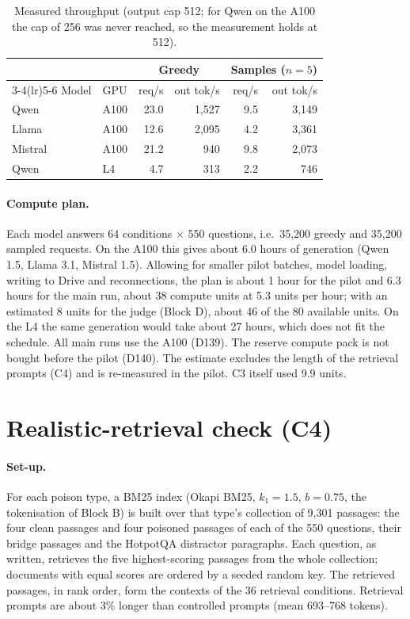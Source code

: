 \documentclass[11pt,a4paper]{report}
\begin{document}
\begin{table}[h]
\centering\small
\begin{tabular}{@{}llrrrr@{}}
\toprule
 & & \multicolumn{2}{c}{Greedy} & \multicolumn{2}{c}{Samples ($n{=}5$)} \\
\cmidrule(lr){3-4}\cmidrule(lr){5-6}
Model & GPU & req/s & out tok/s & req/s & out tok/s \\
\midrule
Qwen    & A100 & 23.0 & 1{,}527 & 9.5 & 3{,}149 \\
Llama   & A100 & 12.6 & 2{,}095 & 4.2 & 3{,}361 \\
Mistral & A100 & 21.2 & 940     & 9.8 & 2{,}073 \\
Qwen    & L4   & 4.7  & 313     & 2.2 & 746 \\
\bottomrule
\end{tabular}
\caption{Measured throughput (output cap 512; for Qwen on the A100 the cap of
256 was never reached, so the measurement holds at 512).}
\label{tab:c3-throughput}
\end{table}

\paragraph{Compute plan.}
Each model answers 64 conditions $\times$ 550 questions, i.e.\ 35{,}200
greedy and 35{,}200 sampled requests. On the A100 this gives about 6.0 hours
of generation (Qwen 1.5, Llama 3.1, Mistral 1.5). Allowing for smaller pilot
batches, model loading, writing to Drive and reconnections, the plan is about
1 hour for the pilot and 6.3 hours for the main run, about 38 compute units
at 5.3 units per hour; with an estimated 8 units for the judge (Block D), about
46 of the 80 available units. On the L4 the same generation would take about
27 hours, which does not fit the schedule. All main runs use the A100 (D139).
The reserve compute pack is not bought before the pilot (D140). The estimate
excludes the length of the retrieval prompts (C4) and is re-measured in the
pilot. C3 itself used 9.9 units.


\section{Realistic-retrieval check (C4)}\label{sec:c4}

\paragraph{Set-up.}
For each poison type, a BM25 index (Okapi BM25, $k_1 = 1.5$, $b = 0.75$, the
tokenisation of Block B) is built over that type's collection of 9{,}301
passages: the four clean passages and four poisoned passages of each of the 550
questions, their bridge passages and the HotpotQA distractor paragraphs. Each
question, as written, retrieves the five highest-scoring passages from the whole
collection; documents with equal scores are ordered by a seeded random key. The
retrieved passages, in rank order, form the contexts of the 36 retrieval
conditions. Retrieval prompts are about 3\% longer than controlled prompts
(mean 693--768 tokens).
\end{document}
